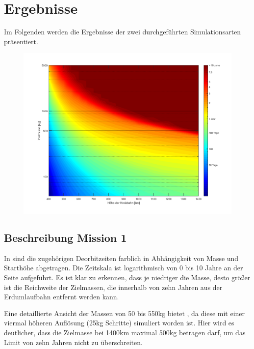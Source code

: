 \section{Ergebnisse}
Im Folgenden werden die Ergebnisse der zwei durchgeführten Simulationsarten präsentiert.
\begin{figure}[h]
\centering
\includegraphics[width=1.00\textwidth]{./graphics/GMAT/GMAT_Mass_over_Height.png}
\label{fig:GMAT_Mass_over_Height}
\end{figure}

\subsection{Beschreibung Mission 1}
In  sind die zugehörigen Deorbitzeiten farblich in Abhängigkeit von Masse und Starthöhe abgetragen. Die Zeitskala ist logarithmisch von 0 bis 10 Jahre an der Seite aufgeführt.  
Es ist klar zu erkennen, dass je niedriger die Masse, desto größer ist die Reichweite der Zielmassen, die innerhalb von zehn Jahren aus der Erdumlaufbahn entfernt werden kann.


Eine detaillierte Ansicht der Massen von 50 bis 550kg bietet , da diese mit einer viermal höheren Auflösung (25kg Schritte) simuliert worden ist. Hier wird es deutlicher, dass die Zielmasse bei 1400km maximal 500kg betragen darf, um das Limit von zehn Jahren nicht zu überschreiten.

